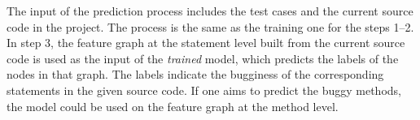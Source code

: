 The input of the prediction process includes the test cases and the
current source code in the project. The process is the same as the
training one for the steps 1--2. In step 3, the feature graph at the
statement level built from the current source code is used as the
input of the {\em trained}  model, which predicts the
labels of the nodes in that graph. The labels indicate the bugginess
of the corresponding statements in the given source code. If one aims
to predict the buggy methods, the  model could be used
on the feature graph at the method level.

